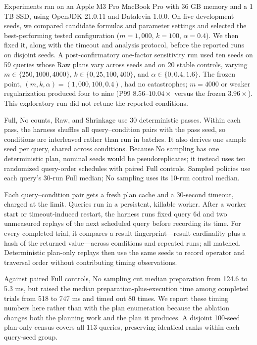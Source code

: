 \documentclass[sigconf]{cidr-2027}
\begin{document}
Experiments ran on an Apple M3 Pro MacBook Pro with 36 GB memory and a 1 TB
SSD, using OpenJDK 21.0.11 and Datalevin 1.0.0.
On five development seeds, we compared candidate formulas and parameter
settings and selected the best-performing tested configuration ($m=1{,}000$,
$k=100$, $\alpha=0.4$). We then fixed it, along with the timeout and analysis
protocol, before the reported runs on disjoint seeds.
A post-confirmatory one-factor sensitivity run used ten seeds on 59 queries
whose Raw plans vary across seeds and on 20 stable controls, varying
$m\in\{250,1000,4000\}$, $k\in\{0,25,100,400\}$, and
$\alpha\in\{0,0.4,1.6\}$. The frozen point,
$(m,k,\alpha)=(1{,}000,100,0.4)$,
had no catastrophes; $m=4000$ or weaker regularization produced four to nine
(P99 $8.56$--$10.04\times$ versus the frozen $3.96\times$). This exploratory
run did not retune the reported conditions.

Full, No counts, Raw, and Shrinkage use 30 deterministic passes. Within each
pass, the harness shuffles all query--condition pairs with the pass seed, so
conditions are interleaved rather than run in batches. It also derives one
sample seed per query, shared across conditions. Because No sampling has one
deterministic plan, nominal seeds would be pseudoreplicates; it instead uses ten
randomized query-order schedules with paired Full controls. Sampled policies use
each query's 30-run Full median; No sampling uses its 10-run control median.

Each query--condition pair gets a fresh plan cache and a 30-second timeout,
charged at the limit. Queries run in a persistent, killable worker. After a
worker start or timeout-induced restart, the harness runs fixed query 6d and
two unmeasured replays of the next scheduled query before recording its time.
For every completed trial, it compares a result fingerprint---result
cardinality plus a hash of the returned value---across conditions and repeated
runs; all matched. Deterministic plan-only replays then use the same seeds to
record operator and traversal order without contributing timing observations.

Against paired Full controls, No sampling cut median preparation from 124.6 to
5.3 ms, but raised the median preparation-plus-execution time among completed
trials from 518 to 747 ms and timed out 80 times. We report these timing
numbers here rather than with the plan enumeration because the ablation
changes both the planning work and the plan it produces. A disjoint 100-seed
plan-only census covers all
113 queries, preserving identical ranks within each query-seed group.
\end{document}
